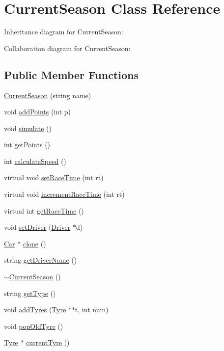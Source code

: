 \hypertarget{classCurrentSeason}{}\section{Current\+Season Class Reference}
\label{classCurrentSeason}


Inheritance diagram for Current\+Season\+:


Collaboration diagram for Current\+Season\+:
\subsection*{Public Member Functions}
\begin{DoxyCompactItemize}
\item 
\hyperlink{classCurrentSeason_a65af23c148bf8745199232459753955f}{Current\+Season} (string name)
\item 
void \hyperlink{classCurrentSeason_a2ae9598222bc7aba71040775c019f297}{add\+Points} (int p)
\item 
void \hyperlink{classCurrentSeason_a4828aaa2c0b914b55ebb34c0d1062e8e}{simulate} ()
\item 
int \hyperlink{classCurrentSeason_acea90ff7b0349785b189199d76b9a9a0}{get\+Points} ()
\item 
int \hyperlink{classCurrentSeason_af605da3db8d851b07265951e5945669c}{calculate\+Speed} ()
\item 
virtual void \hyperlink{classCurrentSeason_aae01cbd64006ce4fe60ea337b4f02962}{set\+Race\+Time} (int rt)
\item 
virtual void \hyperlink{classCurrentSeason_a58d31e4029253b1c244ee44f0052916f}{increment\+Race\+Time} (int rt)
\item 
virtual int \hyperlink{classCurrentSeason_a15328f2c4192d344e970ce111a96946f}{get\+Race\+Time} ()
\item 
void \hyperlink{classCurrentSeason_a3ea9de8713c6d2c21202351b036af75f}{set\+Driver} (\hyperlink{classDriver}{Driver} $\ast$d)
\item 
\hyperlink{classCar}{Car} $\ast$ \hyperlink{classCurrentSeason_afaed34051750fdd603784e6ea7809075}{clone} ()
\item 
string \hyperlink{classCurrentSeason_a3b8912ef6e838fe0a4d735ffc4cd7b66}{get\+Driver\+Name} ()
\item 
\hyperlink{classCurrentSeason_a5f5b214667194da480939a33ada4efae}{$\sim$\+Current\+Season} ()
\item 
string \hyperlink{classCurrentSeason_abeb85d64969c9fd4945bf64ab0464ccd}{get\+Type} ()
\item 
void \hyperlink{classCurrentSeason_a62e6e6c10c5490084230d4c3722196e5}{add\+Tyres} (\hyperlink{classTyre}{Tyre} $\ast$$\ast$t, int num)
\item 
void \hyperlink{classCurrentSeason_a4d58f649f43cc8ea8c1e7e0745b7dc1f}{pop\+Old\+Tyre} ()
\item 
\hyperlink{classTyre}{Tyre} $\ast$ \hyperlink{classCurrentSeason_a9ea661b3a870ecb22026d9a3c7343a8f}{current\+Tyre} ()
\end{DoxyCompactItemize}
